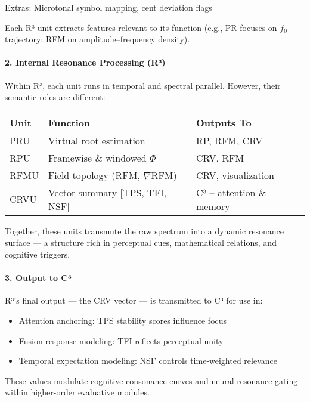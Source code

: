 Extras: Microtonal symbol mapping, cent deviation flags

Each R³ unit extracts features relevant to its function (e.g., PR focuses on $f_0$ trajectory; RFM on amplitude–frequency density).

\paragraph{2. Internal Resonance Processing (R³)}

Within R³, each unit runs in temporal and spectral parallel. However, their semantic roles are different:

\begin{center}
\begin{tabular}{|l|l|l|}
\hline
\textbf{Unit} & \textbf{Function} & \textbf{Outputs To} \\
\hline
PRU & Virtual root estimation & RP, RFM, CRV \\
RPU & Framewise \& windowed $\Phi$ & CRV, RFM \\
RFMU & Field topology (RFM, $\nabla$RFM) & CRV, visualization \\
CRVU & Vector summary [TPS, TFI, NSF] & C³ – attention \& memory \\
\hline
\end{tabular}
\end{center}

Together, these units transmute the raw spectrum into a dynamic resonance surface — a structure rich in perceptual cues, mathematical relations, and cognitive triggers.

\paragraph{3. Output to C³}

R³’s final output — the CRV vector — is transmitted to C³ for use in:

\begin{itemize}
    \item Attention anchoring: TPS stability scores influence focus
    \item Fusion response modeling: TFI reflects perceptual unity
    \item Temporal expectation modeling: NSF controls time-weighted relevance
\end{itemize}

These values modulate cognitive consonance curves and neural resonance gating within higher-order evaluative modules.

